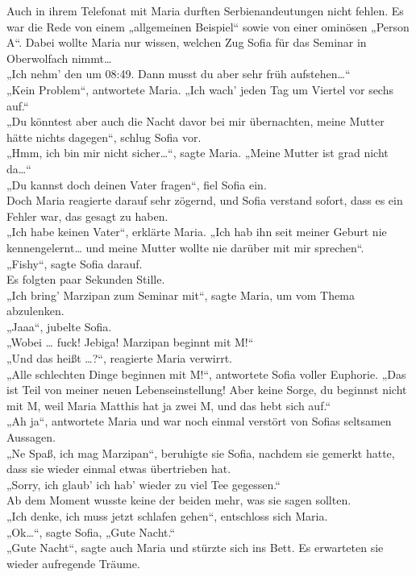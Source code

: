 \documentclass[oneside]{memoir}
\begin{document}
\bigskip
\noindent Auch in ihrem Telefonat mit Maria durften Serbienandeutungen nicht fehlen. Es war die Rede von einem „allgemeinen Beispiel“ sowie von einer ominösen „Person A“. Dabei wollte Maria nur wissen, welchen Zug Sofia für das Seminar in Oberwolfach nimmt\ldots \\
„Ich nehm' den um 08:49. Dann musst du aber sehr früh aufstehen\ldots“ \\
„Kein Problem“, antwortete Maria. „Ich wach' jeden Tag um Viertel vor sechs auf.“ \\
„Du könntest aber auch die Nacht davor bei mir übernachten, meine Mutter hätte nichts dagegen“, schlug Sofia vor. \\
„Hmm, ich bin mir nicht sicher\ldots“, sagte Maria. „Meine Mutter ist grad nicht da\ldots“ \\
„Du kannst doch deinen Vater fragen“, fiel Sofia ein. \\
Doch Maria reagierte darauf sehr zögernd, und Sofia verstand sofort, dass es ein Fehler war, das gesagt zu haben. \\
„Ich habe keinen Vater“, erklärte Maria. „Ich hab ihn seit meiner Geburt nie kennengelernt\ldots{} und meine Mutter wollte nie darüber mit mir sprechen“. \\
„Fishy“, sagte Sofia darauf. \\
Es folgten paar Sekunden Stille. \\
„Ich bring' Marzipan zum Seminar mit“,  sagte Maria, um vom Thema abzulenken. \\
„Jaaa“, jubelte Sofia. \\
„Wobei \ldots{} fuck! Jebiga! Marzipan beginnt mit M!“ \\
„Und das heißt \ldots?“, reagierte Maria verwirrt. \\
„Alle schlechten Dinge beginnen mit M!“, antwortete Sofia voller Euphorie. „Das ist Teil von meiner neuen Lebenseinstellung! Aber keine Sorge, du beginnst nicht mit M, weil Maria Matthis hat ja zwei M, und das hebt sich auf.“ \\
„Ah ja“, antwortete Maria und war noch einmal verstört von Sofias seltsamen Aussagen. \\
„Ne Spaß, ich mag Marzipan“, beruhigte sie Sofia, nachdem sie gemerkt hatte, dass sie wieder einmal etwas übertrieben hat. \\
„Sorry, ich glaub' ich hab' wieder zu viel Tee gegessen.“ \\
Ab dem Moment wusste keine der beiden mehr, was sie sagen sollten. \\
„Ich denke, ich muss jetzt schlafen gehen“, entschloss sich Maria. \\
„Ok\ldots“, sagte Sofia, „Gute Nacht.“ \\
„Gute Nacht“, sagte auch Maria und stürzte sich ins Bett. 
Es erwarteten sie wieder aufregende Träume.
\end{document}
